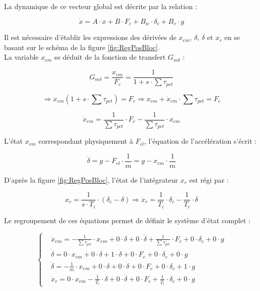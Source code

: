 La dynamique de ce vecteur global est décrite par la relation :

\begin{equation}
    \dot{x} = A \cdot x + B \cdot F_c + B_w \cdot \delta_c + B_v \cdot g
\end{equation}

Il est nécessaire d'établir les expressions des dérivées de $x_{em}$, $\delta$, $\dot{\delta}$ et $x_r$ en se basant sur le schéma de la figure \ref{fig:RegPosBloc}.\\

La variable $x_{em}$ se déduit de la fonction de transfert $G_{m\delta}$ :

$$G_{m\delta} = \frac{x_{em}}{F_c} = \frac{1}{1 + s \cdot \sum\tau_{pct}}$$

$$\Rightarrow x_{em}(1 + s \cdot \sum\tau_{pct}) = F_c \Rightarrow x_{em} + \dot{x}_{em} \cdot \sum\tau_{pct} = F_c$$

\begin{equation}
    \dot{x}_{em} = \frac{1}{\sum\tau_{pct}} \cdot F_c - \frac{1}{\sum\tau_{pct}} \cdot x_{em}
\end{equation}

L'état $x_{em}$ correspondant physiquement à $F_{el}$, l'équation de l'accélération s'écrit :

\begin{equation}
    \ddot{\delta} = g - F_{el} \cdot \frac{1}{m} = g - x_{em} \cdot \frac{1}{m}
\end{equation}

D'après la figure \ref{fig:RegPosBloc}, l'état de l'intégrateur $x_r$ est régi par :

\begin{equation}
    x_r = \frac{1}{s \cdot T_i} \cdot (\delta_c - \delta) \Rightarrow \dot{x}_r = \frac{1}{T_i} \cdot \delta_c - \frac{1}{T_i} \cdot \delta
\end{equation}

Le regroupement de ces équations permet de définir le système d'état complet :

\begin{equation}
    \left\{
    \begin{aligned}
         & \dot{x}_{em} = -\frac{1}{\sum\tau_{pct}} \cdot x_{em} + 0 \cdot \delta + 0 \cdot \dot{\delta} + \frac{1}{\sum\tau_{pct}} \cdot F_c + 0 \cdot \delta_c + 0 \cdot g
        \\
         & \dot{\delta} = 0 \cdot x_{em} + 0 \cdot \delta + 1 \cdot \dot{\delta} + 0 \cdot F_c + 0 \cdot \delta_c + 0 \cdot g
        \\
         & \ddot{\delta} = -\frac{1}{m} \cdot x_{em} + 0 \cdot \delta + 0 \cdot \dot{\delta} + 0 \cdot F_c + 0 \cdot \delta_c + 1 \cdot g
        \\
         & \dot{x}_r = 0 \cdot x_{em} - \frac{1}{T_i} \cdot \delta + 0 \cdot \dot{\delta} + 0 \cdot F_c + \frac{1}{T_i} \cdot \delta_c + 0 \cdot g
    \end{aligned}
    \right.
\end{equation}

